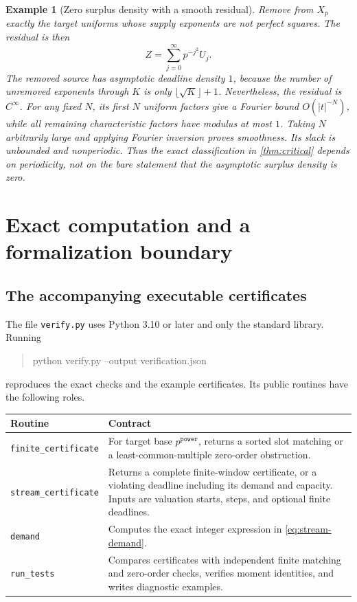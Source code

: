\documentclass[11pt,a4paper]{article}
\newtheorem{example}[theorem]{Example}
\theoremstyle{remark}
\newcommand{\pathtext}[1]{\nolinkurl{#1}}
\begin{document}
\begin{example}[Zero surplus density with a smooth residual]
\label{ex:squares}
Remove from $X_p$ exactly the target uniforms whose supply exponents are not
perfect squares. The residual is then
\[
 Z=\sum_{j=0}^{\infty}p^{-j^2}U_j.
\]
The removed source has asymptotic deadline density $1$, because the number of
unremoved exponents through $K$ is only $\lfloor\sqrt K\rfloor+1$.
Nevertheless, the residual is $C^\infty$. For any fixed $N$, its first $N$
uniform factors give a Fourier bound $O(|t|^{-N})$, while all remaining
characteristic factors have modulus at most $1$. Taking $N$ arbitrarily large
and applying Fourier inversion proves smoothness. Its slack is unbounded and
nonperiodic. Thus the exact classification in \cref{thm:critical} depends on
periodicity, not on the bare statement that the asymptotic surplus density is
zero.
\end{example}

\section{Exact computation and a formalization boundary}
\label{sec:verification}

\subsection{The accompanying executable certificates}

The file \pathtext{verify.py} uses Python 3.10 or later and only the standard
library. Running
\begin{quote}\ttfamily
python verify.py --output verification.json
\end{quote}
reproduces the exact checks and the example certificates. Its public routines
have the following roles.

\begin{center}
\begin{tabularx}{\textwidth}{@{}p{}X@{}}
\toprule
Routine & Contract \\
\midrule
\pathtext{finite_certificate} & For target base $p^{\mathtt{power}}$, returns a sorted slot matching or a least-common-multiple zero-order obstruction. \\
\pathtext{stream_certificate} & Returns a complete finite-window certificate, or a violating deadline including its demand and capacity. Inputs are valuation starts, steps, and optional finite deadlines. \\
\pathtext{demand} & Computes the exact integer expression in \eqref{eq:stream-demand}. \\
\pathtext{run_tests} & Compares certificates with independent finite matching and zero-order checks, verifies moment identities, and writes diagnostic examples. \\
\bottomrule
\end{tabularx}
\end{center}
\end{document}

